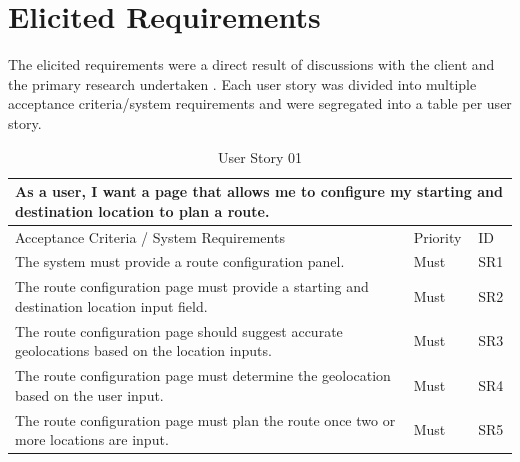 \clearpage
\section{Elicited Requirements}
\label{requirements:user-stories}

The elicited requirements were a direct result of discussions with the client and the primary research undertaken . Each user story was divided into multiple acceptance criteria/system requirements and were segregated into a table per user story.

\begin{table}[!htb]
\caption{User Story 01}
\label{tab:user-story-01}
\begin{tabular}{ p{11cm} p{1cm}  p{1cm} }
\hline
\multicolumn{3}{p{13cm}}{As a user, I want a page that allows me to configure my starting and destination location to plan a route.}\\ 
\hline
Acceptance Criteria / System Requirements & Priority & ID\\
\hline
The system must provide a route configuration panel. & Must & SR1\\
The route configuration page must provide a starting and destination location input field. & Must & SR2\\
The route configuration page should suggest accurate geolocations based on the location inputs. & Must & SR3\\ 
The route configuration page must determine the geolocation based on the user input. & Must & SR4\\ 
The route configuration page must plan the route once two or more locations are input. & Must & SR5\\ 
\hline
\end{tabular}
\end{table}

